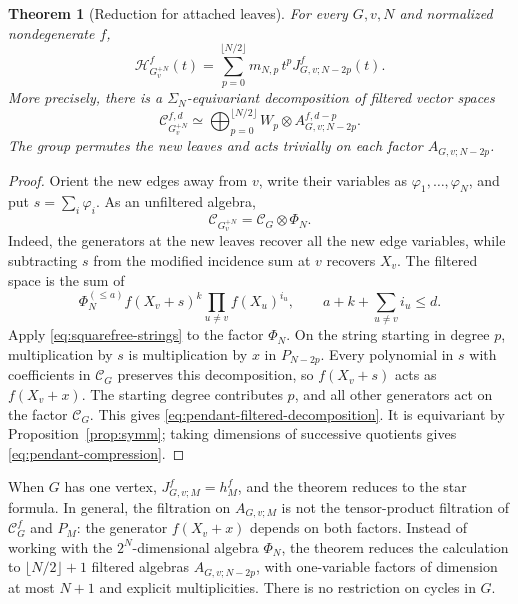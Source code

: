 \documentclass[reqno]{article}
\theoremstyle{plain} %
\newtheorem{theorem}{Theorem}[section]
\theoremstyle{definition}
\theoremstyle{remark}
\newcommand {\CC}{\mathscr{C}}
\newcommand{\hs}{\mathscr{H}}
\numberwithin{equation}{section}
\begin{document}
\begin{theorem}[Reduction for attached leaves]
\label{thm:pendant-compression}
For every $G,v,N$ and normalized nondegenerate $f$,
\begin{equation}\label{eq:pendant-compression}
 \hs_{G_v^{+N}}^f(t)=
 \sum_{p=0}^{\lfloor N/2\rfloor}m_{N,p}\,t^p J_{G,v;N-2p}^f(t).
\end{equation}
More precisely, there is a $\Sigma_N$-equivariant decomposition of
filtered vector spaces
\begin{equation}\label{eq:pendant-filtered-decomposition}
 \CC_{G_v^{+N}}^{f,d}
 \simeq\bigoplus_{p=0}^{\lfloor N/2\rfloor}
           W_p\otimes A_{G,v;N-2p}^{f,d-p}.
\end{equation}
The group permutes the new leaves and acts trivially on each factor
$A_{G,v;N-2p}$.
\end{theorem}
\begin{proof}
Orient the new edges away from $v$, write their variables as
$\varphi_1,\ldots,\varphi_N$, and put $s=\sum_i\varphi_i$.
As an unfiltered algebra,
\[
 \CC_{G_v^{+N}}=\CC_G\otimes\Phi_N.
\]
Indeed, the generators at the new leaves recover all the new edge
variables, while subtracting $s$ from the modified incidence sum at $v$
recovers $X_v$.
The filtered space is the sum of
\[
 \Phi_N^{(\le a)} f(X_v+s)^k
      \prod_{u\ne v}f(X_u)^{i_u},
 \qquad a+k+\sum_{u\ne v}i_u\le d.
\]
Apply \eqref{eq:squarefree-strings} to the factor $\Phi_N$. On the string
starting in degree $p$, multiplication by $s$ is multiplication by $x$
in $P_{N-2p}$. Every polynomial in $s$ with coefficients in $\CC_G$
preserves this decomposition, so $f(X_v+s)$ acts as $f(X_v+x)$.
The starting degree contributes $p$, and all other generators act on
the factor $\CC_G$. This gives \eqref{eq:pendant-filtered-decomposition}.
It is equivariant by Proposition~\ref{prop:symm}; taking dimensions of
successive quotients gives \eqref{eq:pendant-compression}.
\end{proof}

When $G$ has one vertex, $J_{G,v;M}^f=h_M^f$, and the theorem reduces
to the star formula. In general, the filtration on $A_{G,v;M}$ is not
the tensor-product filtration of $\CC_G^f$ and $P_M$: the generator
$f(X_v+x)$ depends on both factors. Instead of working with the
$2^N$-dimensional algebra $\Phi_N$, the theorem reduces the calculation
to $\lfloor N/2\rfloor+1$ filtered algebras $A_{G,v;N-2p}$, with
one-variable factors of dimension at most $N+1$ and explicit
multiplicities. There is no restriction on cycles in $G$.
\end{document}
